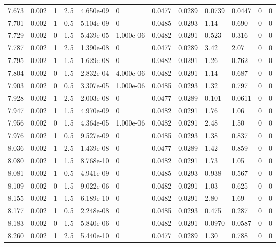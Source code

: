 \documentclass[preview]{standalone}
\begin{document}
{{{{{{\begin{tabular}{L{1.2cm}C{1.2cm} C{0.3cm}C{0.5cm} C{1.4cm}C{1.4cm} C{1.4cm}C{1.4cm} C{1.6cm}C{1.6cm} C{1.6cm}C{1.6cm}}
  7.673  &  0.002  & 1     & 2.5 &  4.650e-09  & 0  &  0.0477&   0.0289& 0.0739 & 0.0447   &  0 & 0  \\ 
  7.701  &  0.002  & 1     & 0.5 &  5.104e-09  & 0  &  0.0485&   0.0293& 1.14 & 0.690   &  0 & 0  \\ 
  7.729  &  0.002  & 0     & 1.5 &  5.439e-05  & 1.000e-06  &  0.0482&   0.0291& 0.523 & 0.316   &  0 & 0  \\ 
  7.787  &  0.002  & 1     & 2.5 &  1.390e-08  & 0  &  0.0477&   0.0289& 3.42 & 2.07   &  0 & 0  \\ 
  7.795  &  0.002  & 1     & 1.5 &  1.629e-08  & 0  &  0.0482&   0.0291& 1.26 & 0.762   &  0 & 0  \\ 
  7.804  &  0.002  & 0     & 1.5 &  2.832e-04  & 4.000e-06  &  0.0482&   0.0291& 1.14 & 0.687   &  0 & 0  \\ 
  7.903  &  0.002  & 0     & 0.5 &  3.307e-05  & 1.000e-06  &  0.0485&   0.0293& 1.32 & 0.797   &  0 & 0  \\ 
  7.928  &  0.002  & 1     & 2.5 &  2.003e-08  & 0  &  0.0477&   0.0289& 0.101 & 0.0611   &  0 & 0  \\ 
  7.947  &  0.002  & 1     & 1.5 &  4.970e-09  & 0  &  0.0482&   0.0291& 1.76 & 1.06   &  0 & 0  \\ 
  7.956  &  0.002  & 0     & 1.5 &  4.364e-05  & 1.000e-06  &  0.0482&   0.0291& 2.48 & 1.50   &  0 & 0  \\ 
  7.976  &  0.002  & 1     & 0.5 &  9.527e-09  & 0  &  0.0485&   0.0293& 1.38 & 0.837   &  0 & 0  \\ 
  8.036  &  0.002  & 1     & 2.5 &  1.439e-08  & 0  &  0.0477&   0.0289& 1.42 & 0.859   &  0 & 0  \\ 
  8.080  &  0.002  & 1     & 1.5 &  8.768e-10  & 0  &  0.0482&   0.0291& 1.73 & 1.05   &  0 & 0  \\ 
  8.081  &  0.002  & 1     & 0.5 &  4.941e-09  & 0  &  0.0485&   0.0293& 0.938 & 0.567   &  0 & 0  \\ 
  8.109  &  0.002  & 0     & 1.5 &  9.022e-06  & 0  &  0.0482&   0.0291& 1.03 & 0.625   &  0 & 0  \\ 
  8.155  &  0.002  & 1     & 1.5 &  6.189e-10  & 0  &  0.0482&   0.0291& 2.80 & 1.69   &  0 & 0  \\ 
  8.177  &  0.002  & 1     & 0.5 &  2.248e-08  & 0  &  0.0485&   0.0293& 0.475 & 0.287   &  0 & 0  \\ 
  8.183  &  0.002  & 0     & 1.5 &  5.840e-06  & 0  &  0.0482&   0.0291& 0.0970 & 0.0587   &  0 & 0  \\ 
  8.260  &  0.002  & 1     & 2.5 &  5.440e-10  & 0  &  0.0477&   0.0289& 1.30 & 0.788   &  0 & 0  \\ 

\end{tabular}}}}}}}
\end{document}
